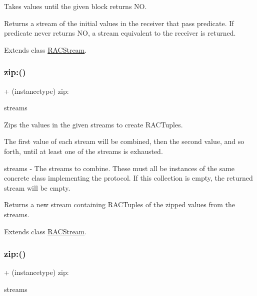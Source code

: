 Takes values until the given block returns {\ttfamily NO}.

Returns a stream of the initial values in the receiver that pass {\ttfamily predicate}. If {\ttfamily predicate} never returns {\ttfamily NO}, a stream equivalent to the receiver is returned. 

Extends class \mbox{\hyperlink{interface_r_a_c_stream_ae3b27f126fffcf5dfb8eaa6bd71c5fc4}{R\+A\+C\+Stream}}.

\mbox{\label{category_r_a_c_stream_07_operations_08_a90ef5f217dc285dc831cc0d45166a529}} 
\subsubsection{\texorpdfstring{zip\+:()}{zip:()}\hspace{0.1cm}{\footnotesize\ttfamily [1/3]}}
{\footnotesize\ttfamily + (instancetype) zip\+: \begin{DoxyParamCaption}\item[{(id$<$ N\+S\+Fast\+Enumeration $>$)}]{streams }\end{DoxyParamCaption}}

Zips the values in the given streams to create R\+A\+C\+Tuples.

The first value of each stream will be combined, then the second value, and so forth, until at least one of the streams is exhausted.

streams -\/ The streams to combine. These must all be instances of the same concrete class implementing the protocol. If this collection is empty, the returned stream will be empty.

Returns a new stream containing R\+A\+C\+Tuples of the zipped values from the streams. 

Extends class \mbox{\hyperlink{interface_r_a_c_stream_a90ef5f217dc285dc831cc0d45166a529}{R\+A\+C\+Stream}}.

\mbox{\label{category_r_a_c_stream_07_operations_08_a90ef5f217dc285dc831cc0d45166a529}} 
\subsubsection{\texorpdfstring{zip\+:()}{zip:()}\hspace{0.1cm}{\footnotesize\ttfamily [2/3]}}
{\footnotesize\ttfamily + (instancetype) zip\+: \begin{DoxyParamCaption}\item[{(id$<$N\+S\+Fast\+Enumeration$>$)}]{streams }\end{DoxyParamCaption}}

